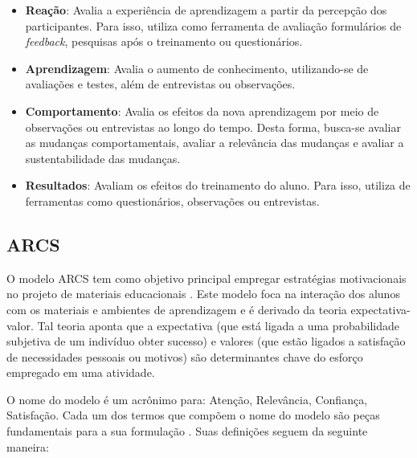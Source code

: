 \begin{itemize}[label={},leftmargin=2em]
\item \textbf{Reação}: Avalia a experiência de aprendizagem a partir da percepção dos participantes. Para isso, utiliza como ferramenta de avaliação formulários de \textit{feedback}, pesquisas após o treinamento ou questionários.
\end{itemize}



\begin{itemize}[label={},leftmargin=2em]
\item \textbf{Aprendizagem}: Avalia o aumento de conhecimento, utilizando-se de avaliações e testes, além de entrevistas ou observações.
\end{itemize}

\begin{itemize}[label={},leftmargin=2em]
\item \textbf{Comportamento}: Avalia os efeitos da nova aprendizagem por meio de observações ou entrevistas ao longo do tempo. Desta forma, busca-se avaliar as mudanças comportamentais, avaliar a relevância das mudanças e avaliar a sustentabilidade das mudanças. 
\end{itemize}

\begin{itemize}[label={},leftmargin=2em]
\item \textbf{Resultados}: Avaliam os efeitos do treinamento do aluno. Para isso, utiliza de ferramentas como questionários, observações ou entrevistas.
\end{itemize}


\pagebreak

\subsection{ARCS}
\label{ARCS}

O modelo \ac{ARCS} tem como objetivo principal empregar estratégias motivacionais no projeto de materiais educacionais \cite{keller1983development}. Este modelo foca na interação dos alunos com os materiais e ambientes de aprendizagem e é derivado da teoria expectativa-valor. Tal teoria aponta que a expectativa (que está ligada a uma probabilidade subjetiva de um indivíduo obter sucesso) e valores (que estão ligados a satisfação de necessidades pessoais ou motivos) são determinantes chave do esforço empregado em uma atividade. 

O nome do modelo é um acrônimo para: Atenção, Relevância, Confiança, Satisfação. Cada um dos termos que compõem o nome do modelo são peças fundamentais para a sua formulação \cite{keller1983development}. Suas definições seguem da seguinte maneira: 

